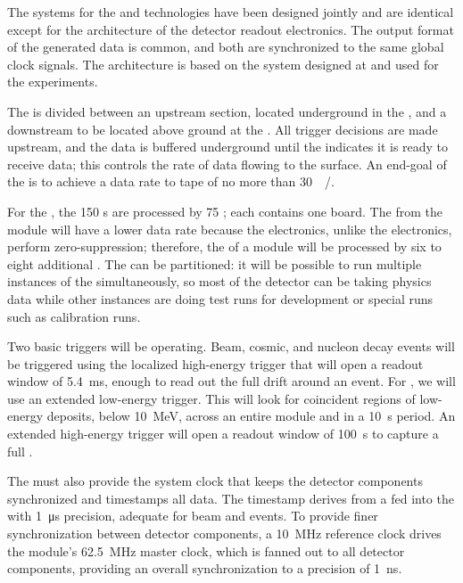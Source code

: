 The  systems for the  and  technologies have been designed jointly and are identical except for the architecture of the detector readout electronics.  
The output format of the generated data is common, and both are synchronized to the same global clock signals.  The  architecture is based on the  system designed at  and used for the  experiments. 

The  is divided between an upstream section, located underground in the , and a downstream  to be located above ground at the . All trigger decisions are made 
upstream, and the data is buffered underground until the  indicates it is ready to receive data; this controls the rate of data flowing to the surface. An end-goal of the  is to achieve a data rate to tape of no more than \SI{30}{\peta\byte/\year}.

For the , the 150 s are processed by 75 ; each  contains one  board. The  from the module will have a lower data rate because the  electronics, unlike the  electronics, perform zero-suppression; therefore, the  of a module will be processed by six to eight additional . The  can be partitioned: it will be possible to run multiple instances of the  simultaneously, so most of the detector can be taking physics data while other  instances are doing test runs for development or special runs such as calibration runs. 

Two basic triggers will be operating. Beam, cosmic, and nucleon decay events will be triggered using the localized high-energy trigger 
that will open a readout window of \SI{5.4}{\ms}, enough to read out the full  drift around an event. For , we will use an extended low-energy trigger. This will look for coincident regions of low-energy deposits, below \SI{10}{\mega\electronvolt}, across an entire module and in a \SI{10}{\second} period. An extended high-energy trigger will open a readout window of \SI{100}{\second} to capture a full . 

The  must also provide the system clock that keeps the detector components synchronized and %
timestamps all data. The timestamp derives from a   fed into the  with \SI{1}{\micro\second} precision, adequate %
for beam and  events. To provide finer synchronization between detector components, a \SI{10}{\mega\hertz} reference clock drives the module's \SI{62.5}{\mega\hertz} master clock, which is fanned out to all detector components, providing an overall synchronization to a precision of \SI{1}{\nano\second}.



